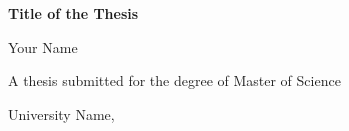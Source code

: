 \documentclass[11pt,a4paper,oneside]{report}
\begin{document}
\begin{titlepage}
  \centering
  \vspace*{3cm}
  {\Huge\bfseries Title of the Thesis\par}
  \vspace{1.5cm}
  {\Large Your Name\par}
  \vfill
  A thesis submitted for the degree of Master of Science\par
  \vspace{0.5cm}
  University Name, \the\year
\end{titlepage}

\tableofcontents





\end{document}
